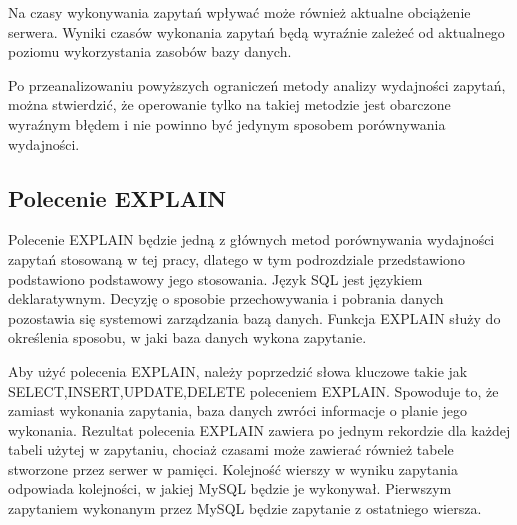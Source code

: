 Na czasy wykonywania zapytań wpływać może również aktualne obciążenie serwera. Wyniki czasów wykonania zapytań będą wyraźnie zależeć od aktualnego poziomu wykorzystania zasobów bazy danych.

Po przeanalizowaniu powyższych ograniczeń metody analizy wydajności zapytań, można stwierdzić, że operowanie tylko na takiej metodzie jest obarczone wyraźnym błędem i nie powinno być jedynym sposobem porównywania wydajności.
\subsection{Polecenie EXPLAIN}
Polecenie EXPLAIN będzie jedną z głównych metod porównywania wydajności zapytań stosowaną w tej pracy, dlatego w tym podrozdziale przedstawiono podstawiono podstawowy jego stosowania. Język SQL jest językiem deklaratywnym. Decyzję o sposobie przechowywania i pobrania danych pozostawia się systemowi zarządzania bazą danych. Funkcja EXPLAIN służy do określenia sposobu, w jaki baza danych wykona zapytanie.

Aby użyć polecenia EXPLAIN, należy poprzedzić słowa kluczowe takie jak SELECT,INSERT,UPDATE,DELETE poleceniem EXPLAIN. Spowoduje to, że zamiast wykonania zapytania, baza danych zwróci informacje o planie jego wykonania. Rezultat polecenia EXPLAIN zawiera po jednym rekordzie dla każdej tabeli użytej w zapytaniu, chociaż czasami może zawierać również tabele stworzone przez serwer w pamięci. Kolejność wierszy w wyniku zapytania odpowiada kolejności, w jakiej MySQL będzie je wykonywał. Pierwszym zapytaniem wykonanym przez MySQL będzie zapytanie z ostatniego wiersza.

